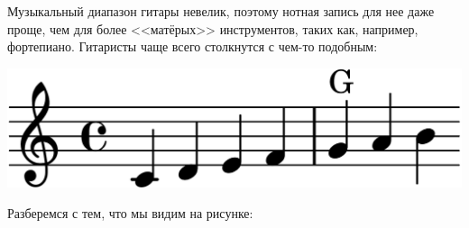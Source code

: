 Музыкальный диапазон гитары невелик, поэтому нотная запись для нее даже проще, чем для более <<матёрых>> инструментов, таких как, например, фортепиано. Гитаристы чаще всего столкнутся с чем-то подобным:

\begin{center}    
    \includegraphics{fig/notes/octave-little}
\end{center}    

Разберемся с тем, что мы видим на рисунке:

